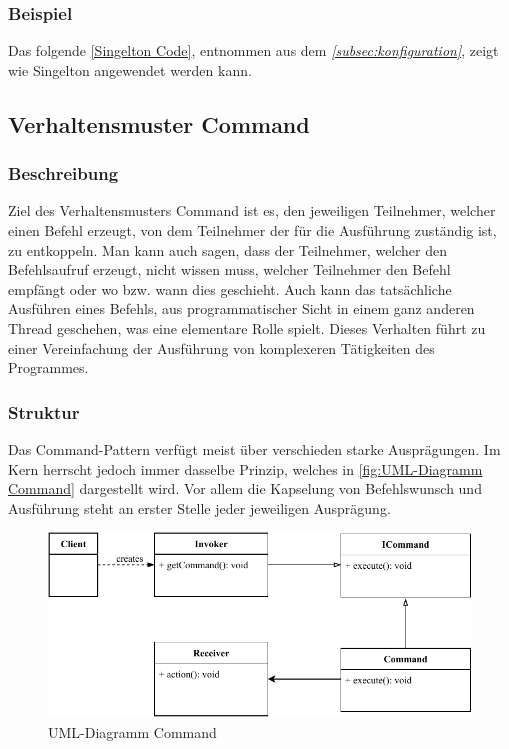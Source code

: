 \subsubsection{Beispiel}
Das folgende \autoref{Singelton Code}, entnommen aus dem \textit{\autoref{subsec:konfiguration}}, zeigt wie Singelton angewendet werden kann.

\subsection{Verhaltensmuster Command}\label{subsec:verhaltensmuster-command}
\subsubsection{Beschreibung}
Ziel des Verhaltensmusters Command ist es, den jeweiligen Teilnehmer, welcher einen Befehl erzeugt, von dem Teilnehmer der für die Ausführung zuständig ist, zu entkoppeln.
Man kann auch sagen, dass der Teilnehmer, welcher den Befehlsaufruf erzeugt, nicht wissen muss, welcher Teilnehmer den Befehl empfängt oder wo bzw. wann dies geschieht.
Auch kann das tatsächliche Ausführen eines Befehls, aus programmatischer Sicht in einem ganz anderen Thread geschehen, was eine elementare Rolle spielt.
Dieses Verhalten führt zu einer Vereinfachung der Ausführung von komplexeren Tätigkeiten des Programmes.
\subsubsection{Struktur}
Das Command-Pattern verfügt meist über verschieden starke Ausprägungen.
Im Kern herrscht jedoch immer dasselbe Prinzip, welches in \autoref{fig:UML-Diagramm Command} dargestellt wird.
Vor allem die Kapselung von Befehlswunsch und Ausführung steht an erster Stelle jeder jeweiligen Ausprägung.
\begin{figure}[H]
    \centering
    \includegraphics[width=1\textwidth]{fig/ainf/Command.pdf}
    \caption{UML-Diagramm Command}
    \label{fig:UML-Diagramm Command}
\end{figure}

